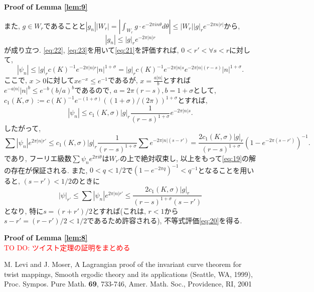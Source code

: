 \documentclass[a4paper]{ujarticle}
\makeatletter
\newcommand{\red}[1]{\textcolor{red}{#1}} %
\numberwithin{equation}{section}
\theoremstyle{definition}
\renewenvironment{proof}[1][Proof]{\par
  \pushQED{\qed}%
  \normalfont \topsep6\p@\@plus6\p@\relax
  \trivlist
  \item\relax
  {\bfseries
  #1\@addpunct{.}}\hspace\labelsep\ignorespaces
}{%
  \popQED\endtrivlist\@endpefalse
}
\makeatother
\begin{document}
\begin{proof}[Proof of Lemma \ref{lem:9}]
            また, $g \in W_r$であることと$\displaystyle |g_n| |W_r| = \left| \int_{W_r} g \cdot e^{-2 \pi i n \theta} d \theta \right| \leq |W_r| |g|_r e^{- 2 \pi n |r|}$から, 
            \begin{equation} \label{eq:23}
                |g_n| \leq |g|_r e^{- 2 \pi |n| r}
            \end{equation}
            が成り立つ. \eqref{eq:22}, \eqref{eq:23}を用いて\eqref{eq:21}を評価すれば,
            $0 < r' < \forall s < r$に対して,
            \begin{equation}
                |\psi_n| \leq |g|_r c(K)^{-1} e^{- 2 \pi |n| r} |n|^{1 + \sigma} = |g|_r c(K)^{-1} e^{- 2 \pi |n| s} e^{- 2 \pi |n| (r - s)} |n|^{1 + \sigma}.
            \end{equation}
            ここで, $x > 0$に対して$x e^{-x} \leq e^{-1}$であるが, $x = \frac{a |n|}{b}$とすれば$e^{-a |n|} |n|^{b} \leq e^{-b} (b/a)^{b}$であるので, 
            $a = 2 \pi (r - s), b = 1 + \sigma$として, $c_1(K, \sigma) := c(K)^{-1} e^{-(1 + \sigma)} ((1 + \sigma)/(2 \pi))^{1 + \sigma}$とすれば, 
            \[
                |\psi_n| \leq  c_1(K, \sigma) |g|_r \frac{1}{(r - s)^{1 + \sigma}} e^{- 2 \pi |n| s} .
            \]
            したがって, 
            \[
                \sum |\psi_n| e^{2 \pi |n| r'} \leq c_1(K, \sigma) |g|_r \frac{1}{(r - s)^{1 + \sigma}} \sum  e^{- 2 \pi |n| (s - r')} = \frac{2 c_1(K, \sigma) |g|_r}{(r - s)^{1 + \sigma}} (1 - e^{- 2 \pi (s - r')})^{-1}.
            \]
            であり, フーリエ級数$\sum \psi_n e^{2 \pi i \theta}$は$W_{r'}$の上で絶対収束し, 以上をもって\eqref{eq:19}の解の存在が保証される.
            また, $0 < q < 1/2$で$(1 - e^{- 2 \pi q})^{-1} < q^{-1}$となることを用いると, $(s - r') < 1/2$のときに
            \[
                |\psi|_{r'} \leq \sum |\psi_n| e^{2 \pi |n| r'} \leq \frac{2 c_1(K, \sigma) |g|_r}{(r - s)^{1 + \sigma}(s - r')} 
            \]
            となり, 特に$s = (r + r')/2$とすれば(これは, $r < 1$から$s - r' = (r - r')/2 < 1/2$であるため許容される), 不等式評価\eqref{eq:20}を得る.
        \end{proof}

        \begin{proof}[Proof of Lemma \ref{lem:8}]\\
            \red{TO DO: ツイスト定理の証明をまとめる}
        \end{proof}
    \begin{thebibliography}{10}
    \nocite{*}
	  M. Levi and J. Moser, A Lagrangian proof of the invariant curve theorem for twist mappings, 
    Smooth ergodic theory and its applications (Seattle, WA, 1999), Proc. Sympos. Pure Math. \textbf{69}, 733-746, Amer. Math. Soc., Providence, RI, 2001 
\end{thebibliography}
\end{document}
